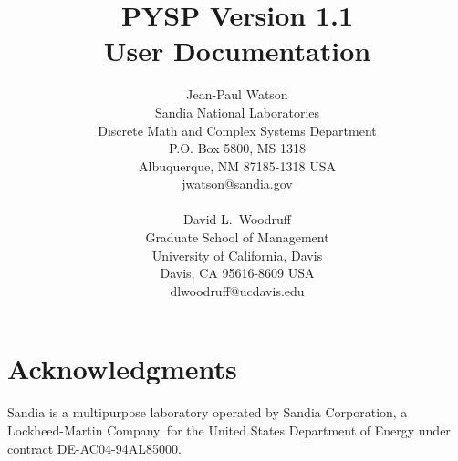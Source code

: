 \documentclass[11pt]{article}
\begin{document}
\title{PYSP Version 1.1\\
User Documentation}

\author{Jean-Paul Watson \\
        Sandia National Laboratories \\
        Discrete Math and Complex Systems Department \\
        P.O. Box 5800, MS 1318 \\
        Albuquerque, NM 87185-1318 USA \\
        jwatson@sandia.gov \\
        \\
        David L.\ Woodruff \\
        Graduate School of Management \\
        University of California, Davis \\
        Davis, CA 95616-8609 USA \\
        dlwoodruff@ucdavis.edu \\
}


\maketitle



{}



\section*{Acknowledgments}

Sandia is a multipurpose laboratory operated by Sandia Corporation, a 
Lockheed-Martin Company, for the United States Department of Energy 
under contract DE-AC04-94AL85000. 
\end{document}
